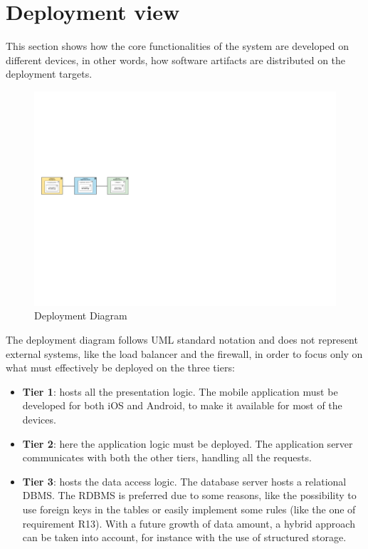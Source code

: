 \documentclass[12pt,a4paper]{report}
\begin{document}
		\section{Deployment view}
This section shows how the core functionalities of the system are developed on different devices, in other words,
how software artifacts are distributed on the deployment targets. 
	\begin{figure}[H]
			\includegraphics[scale = 0.6, center]{DeploymentDiagram}
			\caption{Deployment Diagram}
	\end{figure}
The deployment diagram follows UML standard notation and does not represent external systems, like the load balancer and the firewall, in order to focus only on what must effectively be deployed on the three tiers:
\begin{itemize}
	\item\textbf{Tier 1}: hosts all the presentation logic. The mobile application must be developed for both iOS
and Android, to make it available for most of the devices. 
	\item\textbf{Tier 2}: here the application logic must be deployed. The application server communicates with both
the other tiers, handling all the requests.
	\item\textbf{Tier 3}: hosts the data access logic. The database server hosts a relational DBMS. The RDBMS is
preferred due to some reasons, like the possibility to use foreign keys in the tables or easily implement some rules
(like the one of requirement R13). With a future growth of data amount, a hybrid approach can be taken into account, for instance with the use of structured storage.
\end{itemize}
\end{document}
